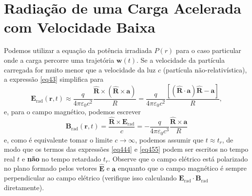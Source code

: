 \documentclass{article}
\begin{document}
\section{Radiação de uma Carga Acelerada com Velocidade Baixa}

Podemos utilizar a equação da potência irradiada $P(r)$ para o caso particular onde a carga percorre uma trajetória $\mathbf{w}(t)$. Se a velocidade da partícula carregada for muito menor que a velocidade da luz $c$ (partícula não-relativística), a expressão \eqref{eq43} simplifica para
\begin{equation}
    \mathbf{E}_{\text{rad}}(\mathbf{r},t) \approx \frac{q}{4\pi\varepsilon_0 c^2}\frac{\hat{\mathbf{R}}\times(\hat{\mathbf{R}}\times\mathbf{a})}{R} = \frac{q}{4\pi\varepsilon_0 c^2} \frac{[(\hat{\mathbf{R}}\cdot\mathbf{a})\hat{\mathbf{R}} - \mathbf{a}]}{R} ,
    \label{eq444}
\end{equation}
e, para o campo magnético, podemos escrever
\begin{equation}
    \mathbf{B}_{\text{rad}}(\mathbf{r},t) = \frac{\hat{\mathbf{R}} \times \mathbf{E}_{\text{rad}}}{c} = -\frac{q}{4\pi\varepsilon_0 c^3}\frac{\hat{\mathbf{R}}\times\mathbf{a}}{R}
    \label{eq455}
\end{equation}
e, como é equivalente tomar o limite $c\rightarrow\infty$, podemos assumir que $t \approx t_r$, de modo que os termos das expressões \eqref{eq444} e \eqref{eq455} podem ser escritos no tempo real $t$ e \textbf{não} no tempo retardado $t_r$. Observe que o campo elétrico está polarizado no plano formado pelos vetores $\hat{\mathbf{E}}$ e $\mathbf{a}$ enquanto que o campo magnético é sempre perpendicular ao campo elétrico (verifique isso calculando $\mathbf{E}_{\text{rad}}\cdot\mathbf{B}_{\text{rad}}$ diretamente).
\end{document}
